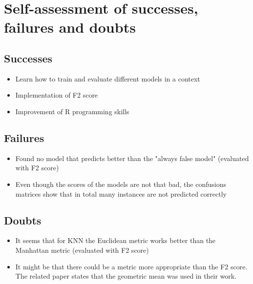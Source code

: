 
\section{Self-assessment of successes, failures and doubts}
\subsection{Successes}
\begin{itemize}
\item{Learn how to train and evaluate different models in a context}
\item{Implementation of F2 score}
\item{Improvement of R programming skills}
\end{itemize}

\subsection{Failures}
\begin{itemize}
\item{Found no model that predicts better than the "always false model" (evaluated with F2 score)}
\item{Even though the scores of the models are not that bad, the confusions matrices show that in total many instances are not predicted correctly}
\end{itemize}

\subsection{Doubts}
\begin{itemize}
\item{It seems that for KNN the Euclidean metric works better than the Manhattan metric (evaluated with F2 score)}
\item{It might be that there could be a metric more appropriate than the F2 score. The related paper states that the geometric mean was used in their work.}
\end{itemize}
